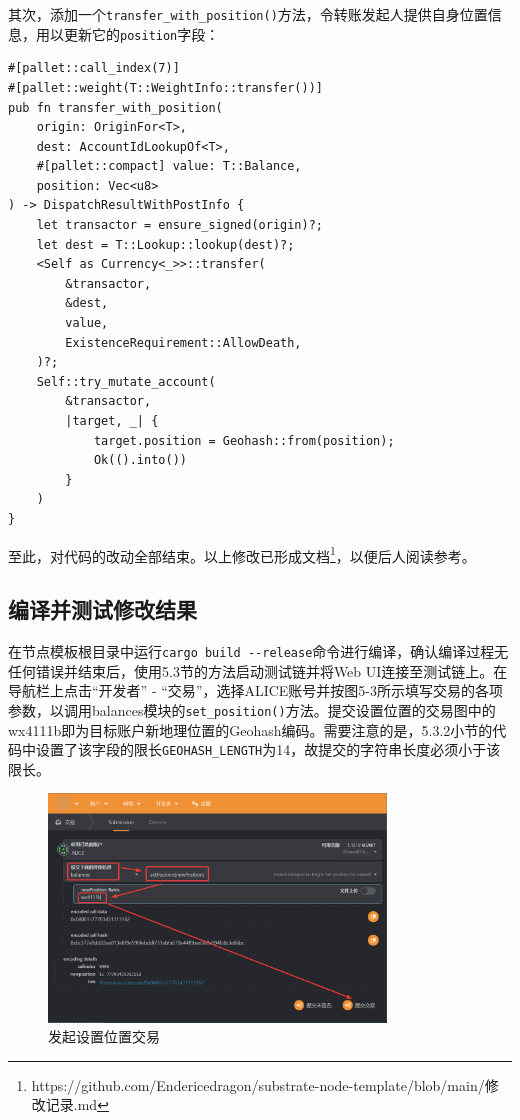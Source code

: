 其次，添加一个\verb|transfer_with_position()|方法，令转账发起人提供自身位置信息，用以更新它的\verb|position|字段：

\begin{lstlisting}
#[pallet::call_index(7)]
#[pallet::weight(T::WeightInfo::transfer())]
pub fn transfer_with_position(
    origin: OriginFor<T>,
    dest: AccountIdLookupOf<T>,
    #[pallet::compact] value: T::Balance,
    position: Vec<u8>
) -> DispatchResultWithPostInfo {
    let transactor = ensure_signed(origin)?;
    let dest = T::Lookup::lookup(dest)?;
    <Self as Currency<_>>::transfer(
        &transactor,
        &dest,
        value,
        ExistenceRequirement::AllowDeath,
    )?;
    Self::try_mutate_account(
        &transactor,
        |target, _| {
            target.position = Geohash::from(position);
            Ok(().into())
        }
    )
}
\end{lstlisting}

至此，对代码的改动全部结束。以上修改已形成文档\footnote{https://github.com/Endericedragon/substrate-node-template/blob/main/修改记录.md}，以便后人阅读参考。

\subsection{编译并测试修改结果}

在节点模板根目录中运行\verb|cargo build --release|命令进行编译，确认编译过程无任何错误并结束后，使用5.3节的方法启动测试链并将Web UI连接至测试链上。在导航栏上点击“开发者” - “交易”，选择ALICE账号并按图5-3所示填写交易的各项参数，以调用balances模块的\verb|set_position()|方法。提交设置位置的交易图中的wx4111b即为目标账户新地理位置的Geohash编码。需要注意的是，5.3.2小节的代码中设置了该字段的限长\verb|GEOHASH_LENGTH|为14，故提交的字符串长度必须小于该限长。

\begin{figure}[htbp]
    \centering
    \includegraphics[width=0.8\textwidth]{images/setPos.png}
    \caption{发起设置位置交易}\label{发起设置位置交易} %
\end{figure}

